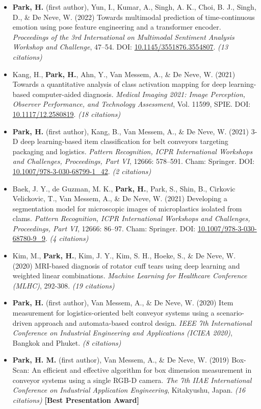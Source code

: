 \documentclass[11pt]{article}
\begin{document}
\begin{itemize}
    \item[\checkmark] \textbf{Park, H.} (first author), Yun, I., Kumar, A., Singh, A. K., Choi, B. J., Singh, D., \& De Neve, W. (2022) Towards multimodal prediction of time-continuous emotion using pose feature engineering and a transformer encoder. \textit{Proceedings of the 3rd International on Multimodal Sentiment Analysis Workshop and Challenge}, 47–54. DOI: \href{https://doi.org/10.1145/3551876.3554807}{10.1145/3551876.3554807}. \textit{(13 citations)}
    \item[\checkmark] Kang, H., \textbf{Park, H.}, Ahn, Y., Van Messem, A., \& De Neve, W. (2021) Towards a quantitative analysis of class activation mapping for deep learning-based computer-aided diagnosis. \textit{Medical Imaging 2021: Image Perception, Observer Performance, and Technology Assessment}, Vol. 11599, SPIE. DOI: \href{https://doi.org/10.1117/12.2580819}{10.1117/12.2580819}. \textit{(18 citations)}
    \item[\checkmark] \textbf{Park, H.} (first author), Kang, B., Van Messem, A., \& De Neve, W. (2021) 3-D deep learning-based item classification for belt conveyors targeting packaging and logistics. \textit{Pattern Recognition, ICPR International Workshops and Challenges, Proceedings, Part VI}, 12666: 578–591. Cham: Springer. DOI: \href{https://doi.org/10.1007/978-3-030-68799-1_42}{10.1007/978-3-030-68799-1\_42}. \textit{(2 citations)}
    \item[\checkmark] Baek, J. Y., de Guzman, M. K., \textbf{Park, H.}, Park, S., Shin, B., Cirkovic Velickovic, T., Van Messem, A., \& De Neve, W. (2021) Developing a segmentation model for microscopic images of microplastics isolated from clams. \textit{Pattern Recognition, ICPR International Workshops and Challenges, Proceedings, Part VI}, 12666: 86–97. Cham: Springer. DOI: \href{https://doi.org/10.1007/978-3-030-68780-9_9}{10.1007/978-3-030-68780-9\_9}. \textit{(4 citations)}
    \item[\checkmark] Kim, M., \textbf{Park, H.}, Kim, J. Y., Kim, S. H., Hoeke, S., \& De Neve, W. (2020) MRI-based diagnosis of rotator cuff tears using deep learning and weighted linear combinations. \textit{Machine Learning for Healthcare Conference (MLHC)}, 292-308. \textit{(19 citations)}
    \item[\checkmark] \textbf{Park, H.} (first author), Van Messem, A., \& De Neve, W. (2020) Item measurement for logistics-oriented belt conveyor systems using a scenario-driven approach and automata-based control design. \textit{IEEE 7th International Conference on Industrial Engineering and Applications (ICIEA 2020)}, Bangkok and Phuket. \textit{(8 citations)}
    \item[\checkmark] \textbf{Park, H. M.} (first author), Van Messem, A., \& De Neve, W. (2019) Box-Scan: An efficient and effective algorithm for box dimension measurement in conveyor systems using a single RGB-D camera. \textit{The 7th IIAE International Conference on Industrial Application Engineering}, Kitakyushu, Japan. \textit{(16 citations)} \textbf{[Best Presentation Award]}
\end{itemize}
\end{document}
